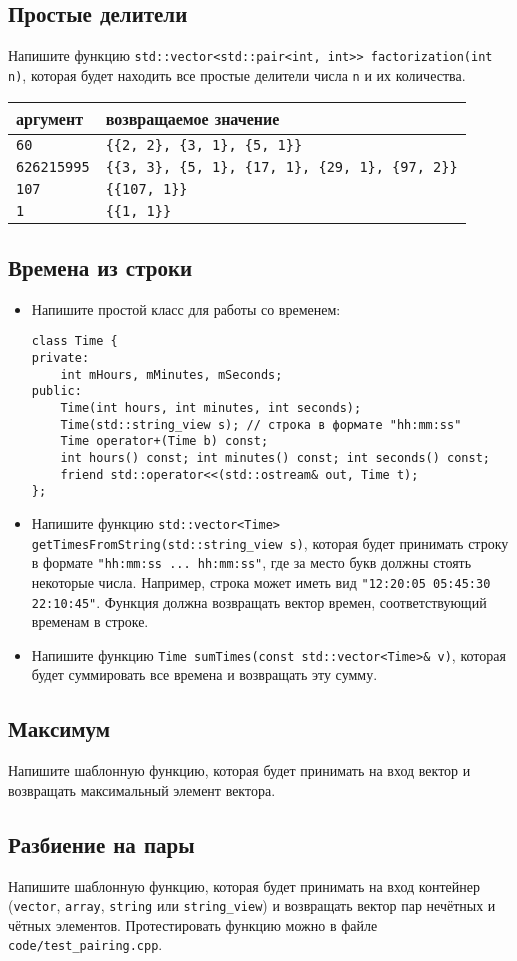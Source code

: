 \documentclass{article}
\begin{document}
\subsection{Простые делители}
Напишите функцию \texttt{std::vector<std::pair<int, int>{}> factorization(int n)}, которая будет находить все простые делители числа \texttt{n} и их количества.
\begin{center}
\begin{tabular}{ l | l }
 аргумент & возвращаемое значение \\ \hline
 \texttt{60} & \texttt{\{\{2, 2\}, \{3, 1\}, \{5, 1\}\}} \\
 \texttt{626215995} & \texttt{\{\{3, 3\}, \{5, 1\}, \{17, 1\}, \{29, 1\}, \{97, 2\}\}} \\
 \texttt{107} & \texttt{\{\{107, 1\}\}} \\
 \texttt{1} & \texttt{\{\{1, 1\}\}} 
\end{tabular}
\end{center}

\subsection{Времена из строки}
\begin{itemize}
\item Напишите простой класс для работы со временем:
\begin{lstlisting}
class Time {
private:
    int mHours, mMinutes, mSeconds;
public:
    Time(int hours, int minutes, int seconds);
    Time(std::string_view s); // строка в формате "hh:mm:ss"
    Time operator+(Time b) const;
    int hours() const; int minutes() const; int seconds() const;
    friend std::operator<<(std::ostream& out, Time t);
};
\end{lstlisting}
\item Напишите функцию \texttt{std::vector<Time> getTimesFromString(std::string\_view s)}, которая будет принимать строку в формате \texttt{"hh:mm:ss ... hh:mm:ss"}, где за место букв должны стоять некоторые числа. Например, строка может иметь вид \texttt{"12:20:05 05:45:30 22:10:45"}. Функция должна возвращать вектор времен, соответствующий временам в строке.\\
\item Напишите функцию \texttt{Time sumTimes(const std::vector<Time>\& v)}, которая будет суммировать все времена и возвращать эту сумму.
\end{itemize}


\subsection{Максимум}
Напишите шаблонную функцию, которая будет принимать на вход вектор и возвращать максимальный элемент вектора.


\subsection{Разбиение на пары}
Напишите шаблонную функцию, которая будет принимать на вход контейнер (\texttt{vector}, \texttt{array}, \texttt{string} или \texttt{string\_view}) и возвращать вектор пар нечётных и чётных элементов. Протестировать функцию можно в файле \texttt{code/test\_pairing.cpp}.
\end{document}

